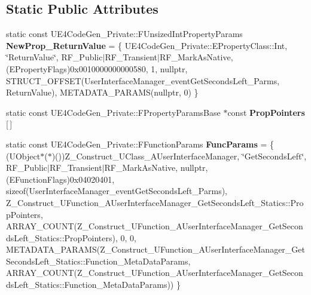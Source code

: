\subsection*{Static Public Attributes}
\begin{DoxyCompactItemize}
\item 
\mbox{\label{struct_z___construct___u_function___a_user_interface_manager___get_seconds_left___statics_ae42c4187d16da07984819d55f3984cff}} 
static const U\+E4\+Code\+Gen\+\_\+\+Private\+::\+F\+Unsized\+Int\+Property\+Params {\bfseries New\+Prop\+\_\+\+Return\+Value} = \{ U\+E4\+Code\+Gen\+\_\+\+Private\+::\+E\+Property\+Class\+::\+Int, \char`\"{}Return\+Value\char`\"{}, R\+F\+\_\+\+Public$\vert$R\+F\+\_\+\+Transient$\vert$R\+F\+\_\+\+Mark\+As\+Native, (E\+Property\+Flags)0x0010000000000580, 1, nullptr, S\+T\+R\+U\+C\+T\+\_\+\+O\+F\+F\+S\+E\+T(\+User\+Interface\+Manager\+\_\+event\+Get\+Seconds\+Left\+\_\+\+Parms, Return\+Value), M\+E\+T\+A\+D\+A\+T\+A\+\_\+\+P\+A\+R\+A\+M\+S(nullptr, 0) \}
\item 
static const U\+E4\+Code\+Gen\+\_\+\+Private\+::\+F\+Property\+Params\+Base $\ast$const {\bfseries Prop\+Pointers} \mbox{[}$\,$\mbox{]}
\item 
\mbox{\label{struct_z___construct___u_function___a_user_interface_manager___get_seconds_left___statics_a4d52e235b401de6d806897316625eb32}} 
static const U\+E4\+Code\+Gen\+\_\+\+Private\+::\+F\+Function\+Params {\bfseries Func\+Params} = \{ (U\+Object$\ast$($\ast$)())Z\+\_\+\+Construct\+\_\+\+U\+Class\+\_\+\+A\+User\+Interface\+Manager, \char`\"{}Get\+Seconds\+Left\char`\"{}, R\+F\+\_\+\+Public$\vert$R\+F\+\_\+\+Transient$\vert$R\+F\+\_\+\+Mark\+As\+Native, nullptr, (E\+Function\+Flags)0x04020401, sizeof(\+User\+Interface\+Manager\+\_\+event\+Get\+Seconds\+Left\+\_\+\+Parms), Z\+\_\+\+Construct\+\_\+\+U\+Function\+\_\+\+A\+User\+Interface\+Manager\+\_\+\+Get\+Seconds\+Left\+\_\+\+Statics\+::\+Prop\+Pointers, A\+R\+R\+A\+Y\+\_\+\+C\+O\+U\+N\+T(\+Z\+\_\+\+Construct\+\_\+\+U\+Function\+\_\+\+A\+User\+Interface\+Manager\+\_\+\+Get\+Seconds\+Left\+\_\+\+Statics\+::\+Prop\+Pointers), 0, 0, M\+E\+T\+A\+D\+A\+T\+A\+\_\+\+P\+A\+R\+A\+M\+S(\+Z\+\_\+\+Construct\+\_\+\+U\+Function\+\_\+\+A\+User\+Interface\+Manager\+\_\+\+Get\+Seconds\+Left\+\_\+\+Statics\+::\+Function\+\_\+\+Meta\+Data\+Params, A\+R\+R\+A\+Y\+\_\+\+C\+O\+U\+N\+T(\+Z\+\_\+\+Construct\+\_\+\+U\+Function\+\_\+\+A\+User\+Interface\+Manager\+\_\+\+Get\+Seconds\+Left\+\_\+\+Statics\+::\+Function\+\_\+\+Meta\+Data\+Params)) \}
\end{DoxyCompactItemize}


